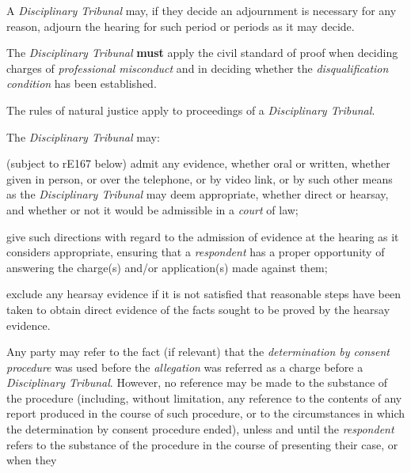 \par
A \emph{Disciplinary Tribunal} may, if they decide an adjournment is
necessary for any reason, adjourn the hearing for such period or periods
as it may decide.\\
\par
{}
The \emph{Disciplinary Tribunal}  \textcolor{myred}{\textbf{must}} apply the civil standard of proof
when deciding charges of \emph{professional misconduct} and in deciding
whether the \emph{disqualification condition} has been established.\\
\par
{}
The rules of natural justice apply to proceedings of
a \emph{Disciplinary Tribunal}.\\
\par
{}
The \emph{Disciplinary Tribunal} may:\\\nl \item (subject to rE167 below) admit any evidence, whether oral or written,
whether given in person, or over the telephone, or by video link, or by
such other means as the \emph{Disciplinary Tribunal} may deem
appropriate, whether direct or hearsay, and whether or not it would be
admissible in a \emph{court} of law;\item give such directions with regard to the admission of evidence at the
hearing as it considers appropriate, ensuring that
a \emph{respondent} has a proper opportunity of answering the charge(s)
and/or application(s) made against them;\item exclude any hearsay evidence if it is not satisfied that reasonable
steps have been taken to obtain direct evidence of the facts sought to
be proved by the hearsay evidence.\ln
{}\par
Any party may refer to the fact (if relevant) that
the \emph{determination by consent procedure} was used before
the \emph{allegation} was referred as a charge before
a \emph{Disciplinary Tribunal}. However, no reference may be made to the
substance of the procedure (including, without limitation, any reference
to the contents of any report produced in the course of such procedure,
or to the circumstances in which the determination by consent procedure
ended), unless and until the \emph{respondent} refers to the substance
of the procedure in the course of presenting their case, or when they
